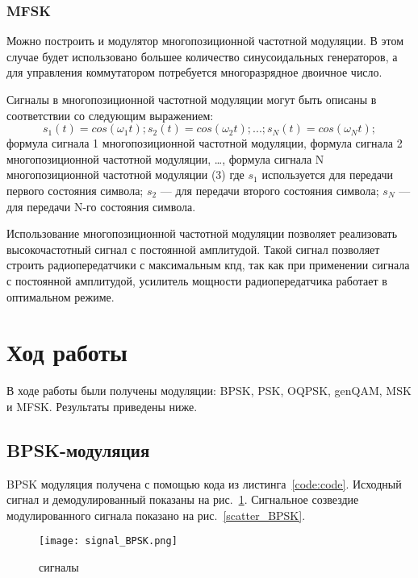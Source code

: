 \subsubsection{MFSK}
Можно построить и модулятор многопозиционной частотной модуляции. В этом случае будет использовано большее количество синусоидальных генераторов, а для управления коммутатором потребуется многоразрядное двоичное число.

Сигналы в многопозиционной частотной модуляции могут быть описаны в соответствии со следующим выражением:
\begin{equation}
	s_1 (t) =  cos(\omega_1 t); s_2 (t) =  cos(\omega_2 t); ...; s_N (t) =  cos(\omega_N t); 
\end{equation}
формула сигнала 1 многопозиционной частотной модуляции,  формула сигнала 2 многопозиционной частотной модуляции, …,  формула сигнала N многопозиционной частотной модуляции (3)
где $s_1$ используется для передачи первого состояния символа;
$s_2$ — для передачи второго состояния символа;
$s_N$ — для передачи N-го состояния символа.

Использование многопозиционной частотной модуляции позволяет реализовать высокочастотный сигнал с постоянной амплитудой. Такой сигнал позволяет строить радиопередатчики с максимальным кпд, так как при применении сигнала с постоянной амплитудой, усилитель мощности радиопередатчика работает в оптимальном режиме.

\section{Ход работы}

В ходе работы были получены модуляции: BPSK, PSK, OQPSK, genQAM, MSK и MFSK.
Результаты приведены ниже.

\subsection{BPSK-модуляция}

BPSK модуляция получена с помощью кода из листинга~\ref{code:code}. 
Исходный сигнал и демодулированный показаны на рис.~\ref{signal_BPSK}. Сигнальное созвездие
модулированного сигнала показано на рис.~\ref{scatter_BPSK}.

\begin{figure}[H]
	\begin{center}
		\texttt{[image: signal\_BPSK.png]}
		\caption{сигналы} %
		\label{signal_BPSK} %
	\end{center}
\end{figure}

